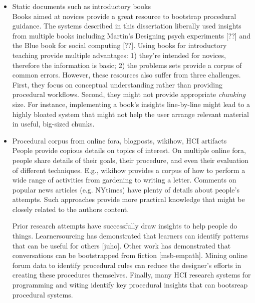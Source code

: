 \begin{itemize}
\item Static documents such as introductory books\\
Books aimed at novices provide a great resource to bootstrap procedural guidance. The systems described in this dissertation liberally used insights from multiple books including Martin’s Designing psych experiments [??] and the Blue book for social computing [??]. Using books for introductory teaching provide multiple advantages: 1) they're intended for novices, therefore the information is basic; 2) the problems sets provide a corpus of common errors. However, these resources also suffer from three challenges. First, they focus on conceptual understanding rather than providing procedural workflows. Second, they might not provide appropriate \textit{chunking} size. For instance, implementing a book's insights line-by-line might lead to a highly bloated system that might not help the user arrange relevant material in useful, big-sized chunks. 

\item Procedural corpus from online fora, blogposts, wikihow, HCI artifacts\\
People provide copious details on topics of interest. On multiple online fora, people share details of their goals, their procedure, and even their evaluation of different techniques. E.g., wikihow provides a corpus of how to perform a wide range of activities from gardening to writing a letter. Comments on popular news articles (e.g. NYtimes) have plenty of details about people's attempts. Such approaches provide more practical knowledge that might be closely related to the author\textquotesingle s content. 

Prior research attempts have successfully draw insights to help people do things. Learnersourcing has demonstrated that learners can identify patterns that can be useful for others [juho]. Other work has demonstrated that conversations can be bootstrapped from fiction [msb-empath]. Mining online forum data to identify procedural rules can reduce the designer's efforts in creating these procedures themselves. Finally, many HCI research systems for programming and witing identify key procedural insights that can bootsreap procedural systems. 


\end{itemize}
